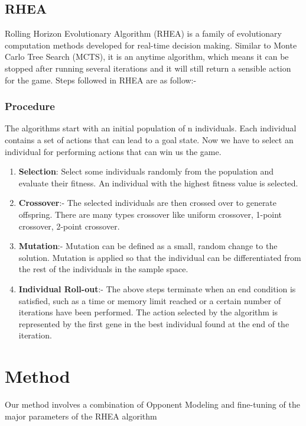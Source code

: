 \documentclass{report}
\begin{document}
	\section{RHEA}
	Rolling Horizon Evolutionary Algorithm (RHEA) is a family of evolutionary computation methods developed for real-time decision making. Similar to Monte Carlo Tree Search (MCTS), it is an anytime algorithm, which means it can be stopped after running several iterations and it will still return a sensible action for the game. 
	Steps followed in RHEA are as follow:-
	\subsection{Procedure}
	The algorithms start with an initial population of n individuals. Each individual contains a set of actions that can lead to a goal state. Now we have to select an individual for performing actions that can win us the game.\cite{gaina2017analysis}
	\begin{enumerate}
	    \item \textbf{Selection}: Select some individuals randomly from the population and evaluate their fitness. An individual with the highest fitness value is selected.
	    \item \textbf{Crossover}:- The selected individuals are then crossed over to generate offspring. There are many types crossover like uniform crossover, 1-point crossover, 2-point crossover. 
	    \item \textbf{Mutation}:- Mutation can be defined as a small, random change to the solution. Mutation is applied so that the individual can be differentiated from the rest of the individuals in the sample space.
	    \item \textbf{Individual Roll-out}:- The above steps terminate when an end condition is satisfied, such as a time or memory limit reached or a certain number of iterations have been performed. The action selected by the algorithm is represented by the first gene in the best individual found at the end of the iteration.
	\end{enumerate}
		
	
	\chapter{Method}

	Our method involves a combination of Opponent Modeling and fine-tuning of the major parameters of the RHEA algorithm
\end{document}

